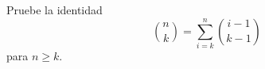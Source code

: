 \begin{statement}{18}
  Pruebe la identidad
  \[
    \binom{n}{k} = \sum_{i = k}^n \binom{i - 1}{k - 1}
  \]
  para $n \geq k$.
\end{statement}